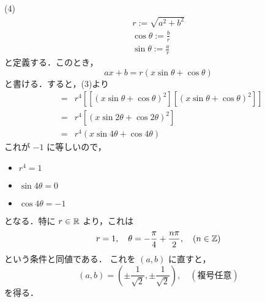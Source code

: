 \documentclass[main]{subfiles}
\begin{document}
\begin{pf}
(4) 
\begin{eqnarray*}
r := \sqrt{a^2+b^2} \\
\cos\theta := \frac{b}{r} \\
\sin\theta := \frac{a}{r}
\end{eqnarray*}
と定義する．このとき，
\begin{equation*}
ax+b= r(x\sin\theta+\cos\theta)
\end{equation*}
と書ける．すると，(3)より
\begin{eqnarray*}
[(ax+b)^4]&=&r^4[[(x\sin\theta+\cos\theta)^2][(x\sin\theta+\cos\theta)^2]] \\
&=&r^4[(x\sin2\theta+\cos2\theta)^2] \\
&=&r^4(x\sin4\theta+\cos4\theta)
\end{eqnarray*}
これが $-1$ に等しいので，
\begin{itemize}
\item $r^4 = 1$ \\
\item $\sin4\theta = 0$ \\
\item $\cos4\theta = -1$
\end{itemize}
となる．特に $r \in \mathbb{R}$ より，これは
\begin{equation*}
r = 1,\quad \theta = -\frac{\pi}{4}+\frac{n\pi}{2}, \quad (n \in \mathbb{Z})
\end{equation*}
という条件と同値である．
これを $(a,b)$ に直すと，
\begin{equation*}
(a,b)=(\pm \frac{1}{\sqrt{2}}, \pm \frac{1}{\sqrt{2}}) ,\quad (\text{複号任意})
\end{equation*}
を得る．
\end{pf}
\begin{prob}

\end{prob}
\end{document}
